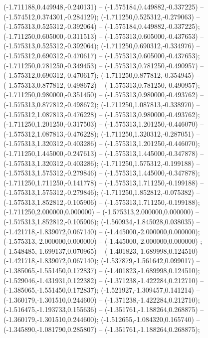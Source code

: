  (-1.711188,0.449948,-0.240131) -- (-1.575184,0.449882,-0.337225) -- (-1.574512,0.374301,-0.284129);
 (-1.711250,0.525312,-0.279063) -- (-1.575313,0.525312,-0.392064) -- (-1.575184,0.449882,-0.337225);
 (-1.711250,0.605000,-0.311513) -- (-1.575313,0.605000,-0.437653) -- (-1.575313,0.525312,-0.392064);
 (-1.711250,0.690312,-0.334976) -- (-1.575312,0.690312,-0.470617) -- (-1.575313,0.605000,-0.437653);
 (-1.711250,0.781250,-0.349453) -- (-1.575313,0.781250,-0.490957) -- (-1.575312,0.690312,-0.470617);
 (-1.711250,0.877812,-0.354945) -- (-1.575313,0.877812,-0.498672) -- (-1.575313,0.781250,-0.490957);
 (-1.711250,0.980000,-0.351450) -- (-1.575313,0.980000,-0.493762) -- (-1.575313,0.877812,-0.498672);
 (-1.711250,1.087813,-0.338970) -- (-1.575312,1.087813,-0.476228) -- (-1.575313,0.980000,-0.493762);
 (-1.711250,1.201250,-0.317503) -- (-1.575313,1.201250,-0.446070) -- (-1.575312,1.087813,-0.476228);
 (-1.711250,1.320312,-0.287051) -- (-1.575313,1.320312,-0.403286) -- (-1.575313,1.201250,-0.446070);
 (-1.711250,1.445000,-0.247613) -- (-1.575313,1.445000,-0.347878) -- (-1.575313,1.320312,-0.403286);
 (-1.711250,1.575312,-0.199188) -- (-1.575313,1.575312,-0.279846) -- (-1.575313,1.445000,-0.347878);
 (-1.711250,1.711250,-0.141778) -- (-1.575313,1.711250,-0.199188) -- (-1.575313,1.575312,-0.279846);
 (-1.711250,1.852812,-0.075382) -- (-1.575313,1.852812,-0.105906) -- (-1.575313,1.711250,-0.199188);
 (-1.711250,2.000000,0.000000) -- (-1.575313,2.000000,0.000000) -- (-1.575313,1.852812,-0.105906);
 (-1.560934,-1.845028,0.038035) -- (-1.421718,-1.839072,0.067140) -- (-1.445000,-2.000000,0.000000);
 (-1.575313,-2.000000,0.000000) -- (-1.445000,-2.000000,0.000000) ;
 (-1.548485,-1.699137,0.070965) -- (-1.401823,-1.689998,0.124510) -- (-1.421718,-1.839072,0.067140);
 (-1.537879,-1.561642,0.099017) -- (-1.385065,-1.551450,0.172837) -- (-1.401823,-1.689998,0.124510);
 (-1.529046,-1.431931,0.122382) -- (-1.371238,-1.422284,0.212710) -- (-1.385065,-1.551450,0.172837);
 (-1.521927,-1.309457,0.141214) -- (-1.360179,-1.301510,0.244600) -- (-1.371238,-1.422284,0.212710);
 (-1.516475,-1.193733,0.155636) -- (-1.351761,-1.188264,0.268875) -- (-1.360179,-1.301510,0.244600);
 (-1.512655,-1.084320,0.165740) -- (-1.345890,-1.081790,0.285807) -- (-1.351761,-1.188264,0.268875);
